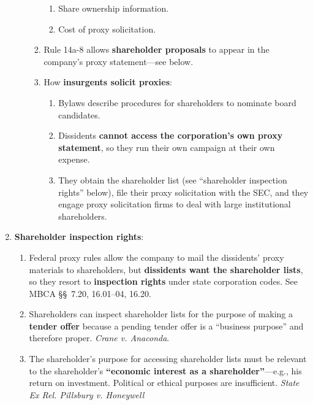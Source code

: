 \begin{enumerate}
\begin{enumerate}
\begin{enumerate}
\begin{enumerate}
                \item Share ownership information.
                \item Cost of proxy solicitation.
            \end{enumerate}
            \item Rule 14a-8 allows \textbf{shareholder proposals} to appear 
            in the company's proxy statement---see below.
            \item How \textbf{insurgents solicit proxies}:
            \begin{enumerate}
                \item Bylaws describe procedures for shareholders to nominate 
                board candidates.
                \item Dissidents \textbf{cannot access the corporation's own 
                proxy statement}, so they run their own campaign at their own 
                expense.
                \item They obtain the shareholder list (see ``shareholder 
                inspection rights'' below), file their proxy solicitation with 
                the SEC, and they engage proxy solicitation firms to deal with 
                large institutional shareholders.
            \end{enumerate}
        \end{enumerate}
    \end{enumerate}
    \item \textbf{Shareholder inspection rights}:
    \begin{enumerate}
        \item Federal proxy rules allow the company to mail the dissidents' 
        proxy materials to shareholders, but \textbf{dissidents want the 
        shareholder lists}, so they resort to \textbf{inspection rights} under 
        state corporation codes. See MBCA \S\S\ 7.20, 16.01--04, 16.20.
        \item Shareholders can inspect shareholder lists for the purpose of 
        making a \textbf{tender offer} because a pending tender offer is a 
        ``business purpose'' and therefore proper. \emph{Crane v. Anaconda}.
        \item The shareholder's purpose for accessing shareholder lists must 
        be relevant to the shareholder's \textbf{``economic interest as a 
        shareholder''}---e.g., his return on investment. Political or ethical 
        purposes are insufficient. \emph{State Ex Rel. Pillsbury v. Honeywell} 

\end{enumerate}
\end{enumerate}
